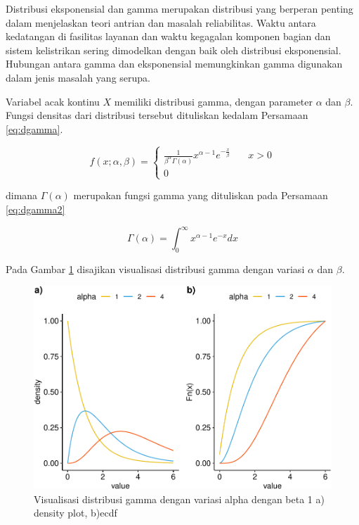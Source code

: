 \documentclass[]{book}
\begin{document}
Distribusi eksponensial dan gamma merupakan distribusi yang berperan
penting dalam menjelaskan teori antrian dan masalah reliabilitas. Waktu
antara kedatangan di fasilitas layanan dan waktu kegagalan komponen
bagian dan sistem kelistrikan sering dimodelkan dengan baik oleh
distribusi eksponensial. Hubungan antara gamma dan eksponensial
memungkinkan gamma digunakan dalam jenis masalah yang serupa.

Variabel acak kontinu \(X\) memiliki distribusi gamma, dengan parameter
\(\alpha\) dan \(\beta\). Fungsi densitas dari distribusi tersebut
dituliskan kedalam Persamaan \eqref{eq:dgamma}.

\begin{equation}
f\left(x;\alpha ,\beta \right) =
  \begin{cases}
    \frac{1}{\beta^{\alpha}\Gamma\left(\alpha\right)}x^{\alpha-1}e^{-\frac{x}{\beta}}       & \quad x>0\\
    0                   & \quad\text{}
    \end{cases}
 \label{eq:dgamma}
\end{equation}

dimana \(\Gamma\left(\alpha\right)\) merupakan fungsi gamma yang
dituliskan pada Persamaan \eqref{eq:dgamma2}

\begin{equation}
   \Gamma\left(\alpha\right)=\int_0^{\infty}x^{\alpha-1}e^{-x}dx
  \label{eq:dgamma2}
\end{equation}

Pada Gambar \ref{fig:gammavis} disajikan visualisasi distribusi gamma
dengan variasi \(\alpha\) dan \(\beta\).

\begin{figure}

{\centering \includegraphics[width=0.9\linewidth]{EnvStat_files/figure-latex/gammavis-1} 

}

\caption{Visualisasi distribusi gamma dengan variasi alpha dengan beta 1 a) density plot, b)ecdf}\label{fig:gammavis}
\end{figure}
\end{document}
